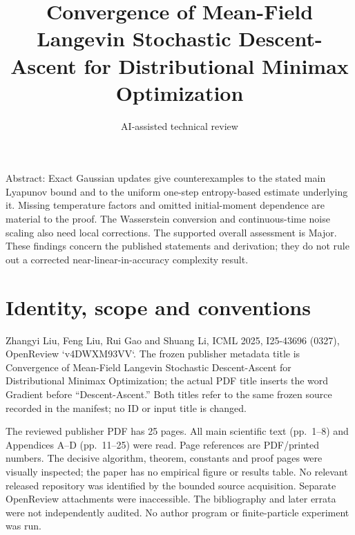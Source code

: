 \documentclass[10pt]{article}
\title{Convergence of Mean-Field Langevin Stochastic Descent-Ascent for Distributional Minimax Optimization}
\author{AI-assisted technical review}
\date{}
\begin{document}
\maketitle
Abstract: Exact Gaussian updates give counterexamples to the stated main Lyapunov bound and to the uniform one-step entropy-based estimate underlying it. Missing temperature factors and omitted initial-moment dependence are material to the proof. The Wasserstein conversion and continuous-time noise scaling also need local corrections. The supported overall assessment is Major. These findings concern the published statements and derivation; they do not rule out a corrected near-linear-in-accuracy complexity result.\par
\section*{Identity, scope and conventions}
Zhangyi Liu, Feng Liu, Rui Gao and Shuang Li, ICML 2025, I25-43696 (0327), OpenReview `v4DWXM93VV`. The frozen publisher metadata title is Convergence of Mean-Field Langevin Stochastic Descent-Ascent for Distributional Minimax Optimization; the actual PDF title inserts the word Gradient before “Descent-Ascent.” Both titles refer to the same frozen source recorded in the manifest; no ID or input title is changed.\par
The reviewed publisher PDF has 25 pages. All main scientific text (pp. 1–8) and Appendices A–D (pp. 11–25) were read. Page references are PDF/printed numbers. The decisive algorithm, theorem, constants and proof pages were visually inspected; the paper has no empirical figure or results table. No relevant released repository was identified by the bounded source acquisition. Separate OpenReview attachments were inaccessible. The bibliography and later errata were not independently audited. No author program or finite-particle experiment was run.\par
\end{document}
